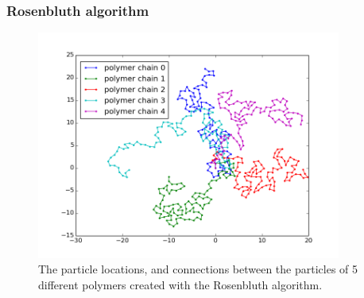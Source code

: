 \documentclass{article}
\begin{document}
\begin{multicols}{2}
\subsubsection*{Rosenbluth algorithm}
 \begin{figure}[ht]
\centering
\includegraphics[width=10cm]{beterepolymerenplaatje.png}
\caption{The particle locations, and connections between the particles of 5 different polymers created with the Rosenbluth algorithm.}
 \label{fig:polymers}
\end{figure} 

\end{multicols}
\end{document}
